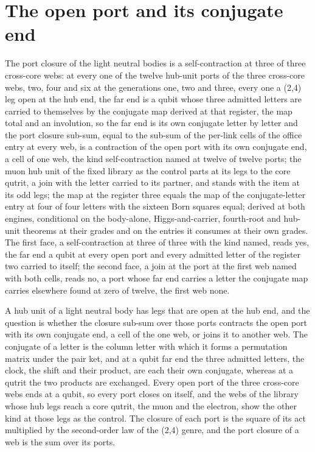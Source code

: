 \section{The open port and its conjugate end}\label{mod:VI-2a-D540922-ptcj-t1}
\begin{chtheorem}
The port closure of the light neutral bodies is a self-contraction at three of three cross-core webs: at every one of the twelve hub-unit ports of the three cross-core webs, two, four and six at the generations one, two and three, every one a (2,4) leg open at the hub end, the far end is a qubit whose three admitted letters are carried to themselves by the conjugate map derived at that register, the map total and an involution, so the far end is its own conjugate letter by letter and the port closure sub-sum, equal to the sub-sum of the per-link cells of the office entry at every web, is a contraction of the open port with its own conjugate end, a cell of one web, the kind self-contraction named at twelve of twelve ports; the muon hub unit of the fixed library as the control parts at its legs to the core qutrit, a join with the letter carried to its partner, and stands with the item at its odd legs; the map at the register three equals the map of the conjugate-letter entry at four of four letters with the sixteen Born squares equal; derived at both engines, conditional on the body-alone, Higgs-and-carrier, fourth-root and hub-unit theorems at their grades and on the entries it consumes at their own grades.
The first face, a self-contraction at three of three with the kind named, reads yes, the far end a qubit at every open port and every admitted letter of the register two carried to itself; the second face, a join at the port at the first web named with both cells, reads no, a port whose far end carries a letter the conjugate map carries elsewhere found at zero of twelve, the first web none.
\end{chtheorem}
\chdeps{}{}
A hub unit of a light neutral body has legs that are open at the hub end, and the question is whether the closure sub-sum over those ports contracts the open port with its own conjugate end, a cell of the one web, or joins it to another web. The conjugate of a letter is the column letter with which it forms a permutation matrix under the pair ket, and at a qubit far end the three admitted letters, the clock, the shift and their product, are each their own conjugate, whereas at a qutrit the two products are exchanged. Every open port of the three cross-core webs ends at a qubit, so every port closes on itself, and the webs of the library whose hub legs reach a core qutrit, the muon and the electron, show the other kind at those legs as the control. The closure of each port is the square of its act multiplied by the second-order law of the (2,4) genre, and the port closure of a web is the sum over its ports.
